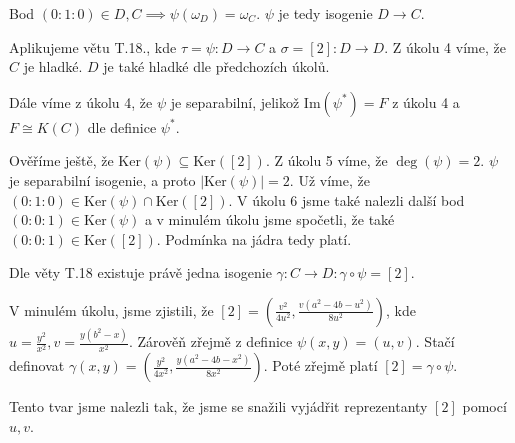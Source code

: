 \documentclass[12pt, a4paper]{article}
\begin{document}
Bod $(0:1:0) \in D, C \implies \psi(\omega_D)=\omega_C$. $\psi$ je tedy isogenie $D \rightarrow C$.

Aplikujeme větu T.18., kde $\tau = \psi: D \rightarrow C$ a $\sigma = [2]: D \rightarrow D$. Z úkolu 4 víme, že $C$ je hladké. $D$ je také hladké dle předchozích úkolů. 

Dále víme z úkolu 4, že $\psi$ je separabilní, jelikož $\text{Im}(\psi^*) = F$ z úkolu 4 a $F \cong K(C)$ dle definice $\psi^*$.

Ověříme ještě, že $\text{Ker}(\psi) \subseteq \text{Ker}([2])$. Z úkolu 5 víme, že $\deg(\psi) = 2$. $\psi$ je separabilní isogenie, a proto $|\text{Ker}(\psi)| = 2$. Už víme, že $(0:1:0) \in \text{Ker}(\psi) \cap \text{Ker}([2])$. V úkolu 6 jsme také nalezli další bod $(0:0:1) \in \text{Ker}(\psi)$ a v minulém úkolu jsme spočetli, že také $(0:0:1) \in \text{Ker}([2])$. Podmínka na jádra tedy platí.

Dle věty T.18 existuje právě jedna isogenie $\gamma: C \rightarrow D: \gamma \circ \psi = [2]$.

V minulém úkolu, jsme zjistili, že $[2]=(\frac{v^2}{4u^2}, \frac{v(a^2-4b-u^2)}{8u^2})$, kde $u = \frac{y^2}{x^2}, v = \frac{y(b^2-x)}{x^2}$. Zárověň zřejmě z definice $\psi(x,y)=(u,v)$. Stačí definovat $\gamma(x,y) = (\frac{y^2}{4x^2}, \frac{y(a^2-4b-x^2)}{8x^2})$. Poté zřejmě platí $[2] = \gamma \circ \psi$.

Tento tvar jsme nalezli tak, že jsme se snažili vyjádřit reprezentanty $[2]$ pomocí $u,v$.
\end{document}
